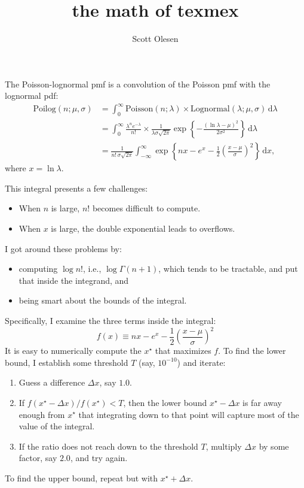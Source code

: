 \documentclass[10pt]{article}
\begin{document}
\title{the math of texmex}
\author{Scott Olesen}

\maketitle

The Poisson-lognormal pmf is a convolution of the Poisson pmf with the lognormal pdf:
\begin{align}
    \mathrm{Poilog}(n; \mu, \sigma) &= \int_0^\infty \mathrm{Poisson}(n; \lambda) \times \mathrm{Lognormal}(\lambda; \mu, \sigma) \,\mathrm{d}\lambda \\
    &= \int_0^\infty \frac{\lambda^n e^{-\lambda}}{n!} \times \frac{1}{\lambda \sigma \sqrt{2 \pi}} \exp \left\{ -\frac{(\ln \lambda - \mu)^2}{2 \sigma^2} \right\} \,\mathrm{d}\lambda \\
    &= \frac{1}{n! \, \sigma \sqrt{2\pi}} \int_{-\infty}^\infty \exp \left\{ nx - e^x - \frac{1}{2} \left(\frac{x - \mu}{\sigma}\right)^2 \right\} \,\mathrm{d}x,
\end{align}
where $x = \ln \lambda$.

This integral presents a few challenges:
\begin{itemize}
\item When $n$ is large, $n!$ becomes difficult to compute.
\item When $x$ is large, the double exponential leads to overflows.
\end{itemize}
I got around these problems by:
\begin{itemize}
\item computing $\log n!$, i.e., $\log \Gamma(n + 1)$, which tends to be tractable, and put that
inside the integrand, and
\item being smart about the bounds of the integral.
\end{itemize}
Specifically, I examine the three terms inside the integral:
\begin{equation}
    f(x) \equiv nx - e^x - \frac{1}{2} \left(\frac{x - \mu}{\sigma}\right)^2
\end{equation}
It is easy to numerically compute the $x^\star$ that maximizes $f$. To find the lower bound, I establish
some threshold $T$ (say, $10^{-10}$) and iterate:
\begin{enumerate}
\item Guess a difference $\Delta x$, say $1.0$.
\item If $f(x^\star - \Delta x) / f(x^\star) < T$, then the lower bound $x^\star - \Delta x$ is far away
enough from $x^\star$ that integrating down to that point will capture most of the value of the integral.
\item If the ratio does not reach down to the threshold $T$, multiply $\Delta x$ by some factor, say $2.0$,
and try again.
\end{enumerate}
To find the upper bound, repeat but with $x^\star + \Delta x$.
\end{document}
